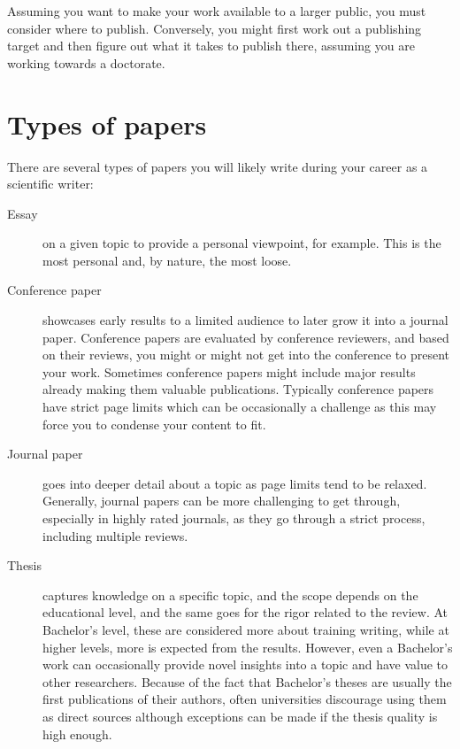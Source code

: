 Assuming you want to make your work available to a larger public, you must consider where to publish.
Conversely, you might first work out a publishing target and then figure out what it takes to publish there, assuming you are working towards a doctorate.

\section{Types of papers}

There are several types of papers you will likely write during your career as a scientific writer:

\begin{description}
    \item[Essay] on a given topic to provide a personal viewpoint, for example. This is the most personal and, by nature, the most loose.
    \item[Conference paper] showcases early results to a limited audience to later grow it into a journal paper. Conference papers are evaluated by conference reviewers, and based on their reviews, you might or might not get into the conference to present your work. Sometimes conference papers might include major results already making them valuable publications. Typically conference papers have strict page limits which can be occasionally a challenge as this may force you to condense your content to fit.
    \item[Journal paper] goes into deeper detail about a topic as page limits tend to be relaxed. Generally, journal papers can be more challenging to get through, especially in highly rated journals, as they go through a strict process, including multiple reviews.
    \item[Thesis] captures knowledge on a specific topic, and the scope depends on the educational level, and the same goes for the rigor related to the review. At Bachelor's level, these are considered more about training writing, while at higher levels, more is expected from the results. However, even a Bachelor's work can occasionally provide novel insights into a topic and have value to other researchers. Because of the fact that Bachelor's theses are usually the first publications of their authors, often universities discourage using them as direct sources although exceptions can be made if the thesis quality is high enough.
\end{description}


